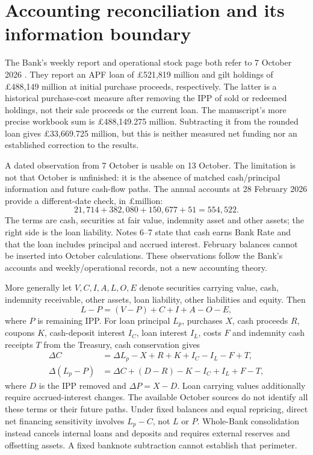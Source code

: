 \section{Accounting reconciliation and its information boundary}\label{sec:accounting}

The Bank's weekly report and operational stock page both refer to 7 October 2026 \citep{BoEweekly,BoEusage}. They report an APF loan of \pounds521,819 million and gilt holdings of \pounds488,149 million at initial purchase proceeds, respectively. The latter is a historical purchase-cost measure after removing the IPP of sold or redeemed holdings, not their sale proceeds or the current loan. The manuscript's more precise workbook sum is \pounds488,149.275 million. Subtracting it from the rounded loan gives \pounds33,669.725 million, but this is neither measured net funding nor an established correction to the results.

A dated observation from 7 October is usable on 13 October. The limitation is not that October is unfinished: it is the absence of matched cash/principal information and future cash-flow paths. The annual accounts at 28 February 2026 \citep{BoEaccounts} provide a different-date check, in \pounds million:
\[
21{,}714+382{,}080+150{,}677+51=554{,}522.
\]
The terms are cash, securities at fair value, indemnity asset and other assets; the right side is the loan liability. Notes 6--7 state that cash earns Bank Rate and that the loan includes principal and accrued interest. February balances cannot be inserted into October calculations. These observations follow the Bank's accounts and weekly/operational records, not a new accounting theory.

More generally let $V,C,I,A,L,O,E$ denote securities carrying value, cash, indemnity receivable, other assets, loan liability, other liabilities and equity. Then
\[
L-P=(V-P)+C+I+A-O-E,
\]
where $P$ is remaining IPP. For loan principal $L_p$, purchases $X$, cash proceeds $R$, coupons $K$, cash-deposit interest $I_C$, loan interest $I_L$, costs $F$ and indemnity cash receipts $T$ from the Treasury, cash conservation gives
\begin{align*}
\Delta C&=\Delta L_p-X+R+K+I_C-I_L-F+T,\\
\Delta(L_p-P)&=\Delta C+(D-R)-K-I_C+I_L+F-T,
\end{align*}
where $D$ is the IPP removed and $\Delta P=X-D$. Loan carrying values additionally require accrued-interest changes. The available October sources do not identify all these terms or their future paths. Under fixed balances and equal repricing, direct net financing sensitivity involves $L_p-C$, not $L$ or $P$. Whole-Bank consolidation instead cancels internal loans and deposits and requires external reserves and offsetting assets. A fixed banknote subtraction cannot establish that perimeter.

